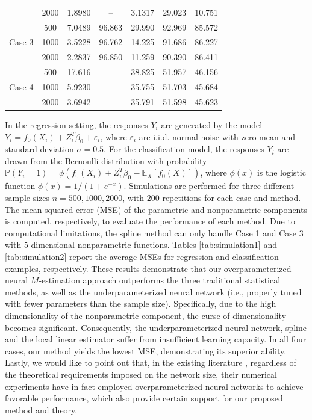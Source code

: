 \begin{table}[tb]
\begin{tabular}{cc| ccccc}
    &2000 &  1.8980  &  --  &  3.1317  &  29.023 & 10.751 \\
    \multirow{3}{*}{Case 3}
    & 500 &  7.0489  &  96.863  &  29.990  &  92.969 & 85.572 \\
    &1000 &  3.5228  &  96.762  &  14.225  & 91.686  & 86.227 \\
    &2000 &  2.2837  &   96.850 &  11.259  & 90.390  & 86.411 \\
    \multirow{3}{*}{Case 4}
    & 500 &  17.616  &  --  &  38.825  & 51.957  & 46.156\\
    &1000 &  5.9230  &  --  &  35.755  & 51.703 &  45.684\\
    &2000 &  3.6942  &  --  &  35.791  & 51.598  & 45.623\\
         \bottomrule[1pt]
	\end{tabular}
  \end{table}


In the regression setting, the responses \(Y_i\) are generated by the model \(Y_i = f_0(X_i) + Z_i^T \beta_0 + \varepsilon_i\), where \(\varepsilon_i\) are i.i.d. normal noise with zero mean and standard deviation \(\sigma = 0.5 \). 
For the classification model, the responses \(Y_i\) are drawn from the Bernoulli distribution with probability \(\mathbb{P}(Y_i = 1) = \phi(f_0(X_i) + Z_i^T \beta_0 - \mathbb{E}_X[f_0(X)])\), where \(\phi(x)\) is the logistic function \(\phi(x) = 1/(1 + e^{-x})\). Simulations are performed for three different sample sizes \(n = 500, 1000, 2000\), with $200$ repetitions for each case and method. 
The mean squared error (MSE) of the parametric and nonparametric components is computed, respectively, to evaluate the performance of each method. 
Due to computational limitations, the spline method can only handle Case 1 and Case 3 with $5$-dimensional nonparametric functions.
Tables \ref{tab:simulation1} and \ref{tab:simulation2} report the average MSEs for regression and classification examples, respectively. 
These results demonstrate that our overparameterized neural $M$-estimation approach outperforms the three traditional statistical methods, as well as the underparameterized neural network (i.e., properly tuned with fewer parameters than the sample size). Specifically, due to the high dimensionality of the nonparametric component, the curse of dimensionality becomes significant. Consequently, the underparameterized neural network, spline and the local linear estimator suffer from insufficient learning capacity. 
In all four cases, our method yields the lowest MSE, demonstrating its superior ability.
Lastly, we would like to point out that, in the existing literature \citep[e.g.][]{deepcox,fan2022factor,wang2024deep,yan2023nonparametricregressionrepeatedmeasurements}, regardless of the theoretical requirements imposed on the network size, their numerical experiments have in fact employed  overparameterized neural networks to achieve favorable performance, which also provide certain support for our proposed method and theory. 

